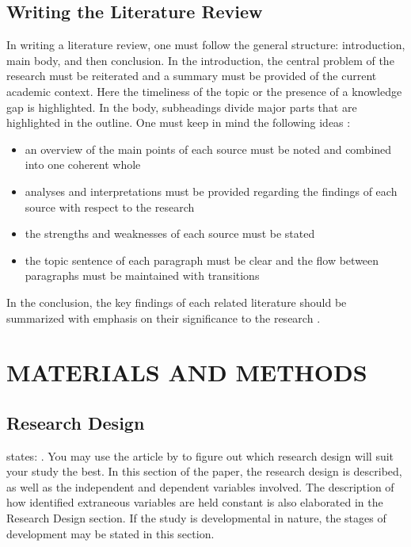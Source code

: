 \documentclass{strrespaper-trad}
\begin{document}
		\section*{Writing the Literature Review}
			In writing a literature review, one must follow the general structure: introduction, main body, and then conclusion.
			In the introduction, the central problem of the research must be reiterated and a summary must be provided of the current academic context.
			Here the timeliness of the topic or the presence of a knowledge gap is highlighted.
			In the body, subheadings divide major parts that are highlighted in the outline.
			One must keep in mind the following ideas \autocite{mccombesLiteratureReviewComplete2019}:
			\begin{itemize}
				\item an overview of the main points of each source must be noted and combined into one coherent whole
				\item analyses and interpretations must be provided regarding the findings of each source with respect to the research
				\item the strengths and weaknesses of each source must be stated
				\item the topic sentence of each paragraph must be clear and the flow between paragraphs must be maintained with transitions
			\end{itemize}
			In the conclusion, the key findings of each related literature should be summarized with emphasis on their significance to the research \autocite{mccombesLiteratureReviewComplete2019}.

	\chapter{MATERIALS AND METHODS}
		\section{Research Design}
			\textcite{labareeTypesResearchDesigns2020} states: .
			You may use the article by \textcite{labareeTypesResearchDesigns2020} to figure out which research design will suit your study the best.
			In this section of the paper, the research design is described, as well as the independent and dependent variables involved.
			The description of how identified extraneous variables are held constant is also elaborated in the Research Design section.
			If the study is developmental in nature, the stages of development may be stated in this section.
\end{document}
